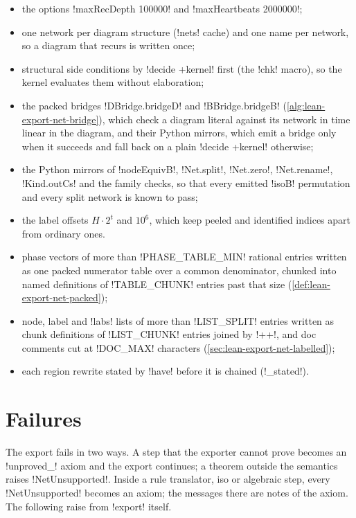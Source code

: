 {\begin{itemize}
\item the options \code!maxRecDepth 100000! and \code!maxHeartbeats 2000000!;
\item one network per diagram structure (\py!nets! cache) and one name per network, so a diagram
  that recurs is written once;
\item structural side conditions by \code!decide +kernel! first (the \code!chk! macro), so the
  kernel evaluates them without elaboration;
\item the packed bridges \lean!DBridge.bridgeD! and \lean!BBridge.bridgeB!
  (\cref{alg:lean-export-net-bridge}), which check a diagram literal against its network in time
  linear in the diagram, and their Python mirrors, which emit a bridge only when it succeeds and
  fall back on a plain \code!decide +kernel! otherwise;
\item the Python mirrors of \lean!nodeEquivB!, \lean!Net.split!, \lean!Net.zero!,
  \lean!Net.rename!, \lean!Kind.outCs! and the family checks, so that every emitted
  \lean!isoB! permutation and every split network is known to pass;
\item the label offsets $H\cdot2^t$ and $10^6$, which keep peeled and identified indices apart
  from ordinary ones.
\item phase vectors of more than \py!PHASE_TABLE_MIN! rational entries written as one packed
  numerator table over a common denominator, chunked into named definitions of
  \py!TABLE_CHUNK! entries past that size (\cref{def:lean-export-net-packed});
\item node, label and \code!labs! lists of more than \py!LIST_SPLIT! entries written as chunk
  definitions of \py!LIST_CHUNK! entries joined by \code!++!, and doc comments cut at
  \py!DOC_MAX! characters (\cref{sec:lean-export-net-labelled});
\item each region rewrite stated by \lean!have! before it is chained (\py!_stated!).
\end{itemize}

\section{Failures}\label{sec:lean-export-net-failures}

The export fails in two ways. A step that the exporter cannot prove becomes an \code!unproved_!
axiom and the export continues; a theorem outside the semantics raises \py!NetUnsupported!.
Inside a rule translator, iso or algebraic step, every \py!NetUnsupported! becomes an axiom; the
messages there are notes of the axiom. The following raise from \py!export! itself.

}
